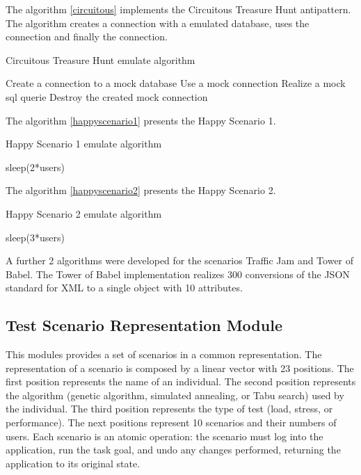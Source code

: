 \documentclass[times]{stvrauth}
\begin{document}
The algorithm \ref{circuitous} implements the Circuitous Treasure Hunt antipattern. The algorithm creates a connection with a emulated database, uses the connection and finally the connection.

\begin{algorithm}[H]
  \caption{Circuitous Treasure Hunt emulate algorithm}
  \label{circuitous}
  \begin{algorithmic}[1]
    
        \State Create a connection to a mock  database
        \State Use a mock connection
        \State Realize a mock sql querie
        \State Destroy the created mock connection     
        \EndFor
    \EndFor
      
  \end{algorithmic}
\end{algorithm}

The algorithm \ref{happyscenario1} presents the Happy Scenario 1. 

\begin{algorithm}[H]
  \caption{Happy Scenario 1 emulate algorithm}\label{happyscenario1}
  \begin{algorithmic}[1]
    \State sleep(2*users)   
  \end{algorithmic}
\end{algorithm}

The algorithm \ref{happyscenario2} presents the Happy Scenario 2. 

\begin{algorithm}[H]
  \caption{Happy Scenario 2 emulate algorithm}\label{happyscenario2}
  \begin{algorithmic}[1]
    \State sleep(3*users)   
  \end{algorithmic}
\end{algorithm}

A further 2 algorithms were developed for the scenarios Traffic Jam and Tower of Babel. The Tower of Babel implementation realizes 300 conversions of the JSON standard for XML to a single object with 10 attributes.

\subsection{Test Scenario Representation Module}

This modules provides a set of scenarios in a common representation. The representation of a scenario is composed by a linear vector with 23 positions. The first position represents the name of an individual. The second position represents the algorithm (genetic algorithm, simulated annealing, or Tabu search) used by the individual. The third position represents the type of test (load, stress, or performance). The next positions represent 10 scenarios and their numbers of users. Each scenario is an atomic operation: the scenario must log into the application, run the task goal, and undo any changes performed, returning the application to its original state.
\end{document}
